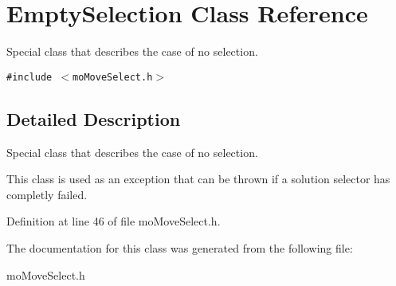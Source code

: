 \section{Empty\-Selection Class Reference}
\label{class_empty_selection}
Special class that describes the case of no selection.  


{\tt \#include $<$mo\-Move\-Select.h$>$}



\subsection{Detailed Description}
Special class that describes the case of no selection. 

This class is used as an exception that can be thrown if a solution selector has completly failed. 



Definition at line 46 of file mo\-Move\-Select.h.

The documentation for this class was generated from the following file:\begin{CompactItemize}
\item 
mo\-Move\-Select.h\end{CompactItemize}
